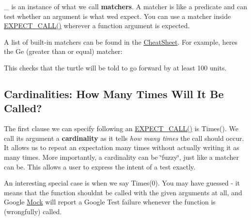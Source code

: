\begin{DoxyCode}{0}
\DoxyCodeLine{\textcolor{comment}{// Expects the turtle to move forward.}}
\end{DoxyCode}


{\ttfamily \+\_\+} is an instance of what we call {\bfseries{matchers}}. A matcher is like a predicate and can test whether an argument is what we\textquotesingle{}d expect. You can use a matcher inside {\ttfamily \mbox{\hyperlink{googletest-master_2googlemock_2include_2gmock_2gmock-spec-builders_8h_a535a6156de72c1a2e25a127e38ee5232}{E\+X\+P\+E\+C\+T\+\_\+\+C\+A\+L\+L()}}} wherever a function argument is expected.

A list of built-\/in matchers can be found in the \mbox{\hyperlink{_obj__test_2lib_2googletest-release-1_88_81_2googlemock_2docs_2_cheat_sheet_8md}{Cheat\+Sheet}}. For example, here\textquotesingle{}s the {\ttfamily Ge} (greater than or equal) matcher\+:


\begin{DoxyCode}{0}
\end{DoxyCode}


This checks that the turtle will be told to go forward by at least 100 units.

\subsection*{Cardinalities\+: How Many Times Will It Be Called?}

The first clause we can specify following an {\ttfamily \mbox{\hyperlink{googletest-master_2googlemock_2include_2gmock_2gmock-spec-builders_8h_a535a6156de72c1a2e25a127e38ee5232}{E\+X\+P\+E\+C\+T\+\_\+\+C\+A\+L\+L()}}} is {\ttfamily Times()}. We call its argument a {\bfseries{cardinality}} as it tells {\itshape how many times} the call should occur. It allows us to repeat an expectation many times without actually writing it as many times. More importantly, a cardinality can be \char`\"{}fuzzy\char`\"{}, just like a matcher can be. This allows a user to express the intent of a test exactly.

An interesting special case is when we say {\ttfamily Times(0)}. You may have guessed -\/ it means that the function shouldn\textquotesingle{}t be called with the given arguments at all, and Google \mbox{\hyperlink{class_mock}{Mock}} will report a Google Test failure whenever the function is (wrongfully) called.

